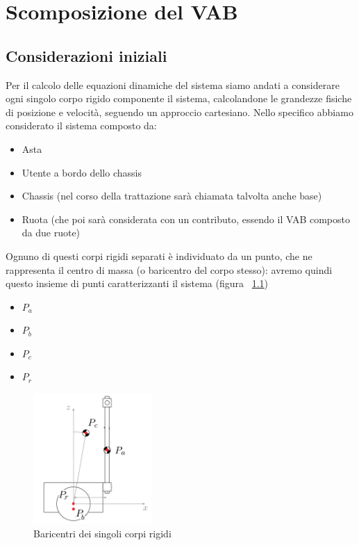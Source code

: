 \chapter{Scomposizione del VAB}
\section{Considerazioni iniziali}
Per il calcolo delle equazioni dinamiche del sistema siamo andati a considerare ogni singolo corpo rigido componente il sistema, calcolandone le grandezze fisiche di posizione e velocità, seguendo un approccio cartesiano. 
Nello specifico abbiamo considerato il sistema composto da:
\begin{itemize}
	\item Asta
	\item Utente a bordo dello chassis
	\item Chassis (nel corso della trattazione sarà chiamata talvolta anche base)
	\item Ruota (che poi sarà considerata con un contributo, essendo il VAB composto da due ruote)
\end{itemize}

Ognuno di questi corpi rigidi separati è individuato da un punto, che ne rappresenta il centro di massa (o baricentro del corpo stesso): avremo quindi questo insieme di punti caratterizzanti il sistema (figura ~\ref{fig:VAB_baricentri})

\begin{itemize}
	\item \textbf{$P_a$}
	\item \textbf{$P_b$}
	\item \textbf{$P_c$}
	\item \textbf{$P_r$}
\end{itemize}

\begin{figure}[h]
	\centering   	
	\includegraphics[width=0.4\textwidth]{Immagini/VAB_baricentrum.png}
	\caption{Baricentri dei singoli corpi rigidi}
	\label{fig:VAB_baricentri}
\end{figure} 

